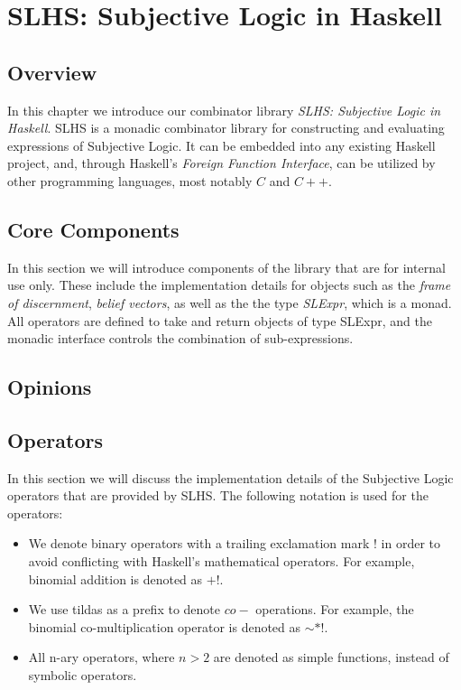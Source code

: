 \documentclass[thesis.tex]{subfiles}
\begin{document}
\chapter{SLHS: Subjective Logic in Haskell}


\section{Overview}

In this chapter we introduce our combinator library \emph{SLHS:
  Subjective Logic in Haskell}. SLHS is a monadic combinator library
for constructing and evaluating expressions of Subjective Logic. It
can be embedded into any existing Haskell project, and, through
Haskell's \emph{Foreign Function Interface}, can be utilized by other
programming languages, most notably $C$ and $C++$.


\section{Core Components}

In this section we will introduce components of the library that
are for internal use only. These include the implementation details
for objects such as the \emph{frame of discernment}, \emph{belief
  vectors}, as well as the the type \emph{SLExpr}, which is a monad.
All operators are defined to take and return objects of type
SLExpr, and the monadic interface controls the combination of
sub-expressions.






\section{Opinions}




\section{Operators}

In this section we will discuss the implementation details of the
Subjective Logic operators that are provided by SLHS. The following
notation is used for the operators:

\begin{itemize}
  \item We denote binary operators with a trailing exclamation mark
    $!$ in order to avoid conflicting with Haskell's mathematical
    operators. For example, binomial addition is denoted as $+!$.
  \item We use tildas as a prefix to denote $co-$ operations. For
    example, the binomial co-multiplication operator is denoted as
    $\sim *!$.
  \item All n-ary operators, where $n > 2$ are denoted as simple
    functions, instead of symbolic operators.
\end{itemize}
\end{document}

